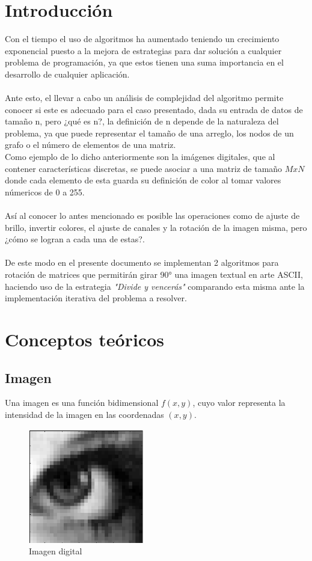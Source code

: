 \documentclass[12pt,twoside]{article}
\begin{document}
    \section{Introducci\'on}
    Con el tiempo el uso de algoritmos ha aumentado teniendo un crecimiento exponencial puesto a la mejora de estrategias para dar soluci\'on a cualquier problema de programaci\'on, ya que estos tienen una suma importancia en el desarrollo de cualquier aplicaci\'on.\\
    \\
    Ante esto, el llevar a cabo un an\'alisis de complejidad del algoritmo permite conocer si este es adecuado para el caso presentado, dada su entrada de datos de tama\~no n, pero ¿qu\'e es n?, la definici\'on de n depende de la naturaleza del problema, ya que puede representar el tama\~no de una arreglo, los nodos de un grafo o el n\'umero de elementos de una matriz.\\
    Como ejemplo de lo dicho anteriormente son la im\'agenes digitales, que al contener caracter\'isticas discretas, se puede asociar a una matriz de tama\~no $MxN$ donde cada elemento de esta guarda su definici\'on de color al tomar valores n\'umericos de 0 a 255.\\
    \\
    As\'i al conocer lo antes mencionado es posible las operaciones como de ajuste de brillo, invertir colores, el ajuste de canales y la rotaci\'on de la imagen misma, pero ¿c\'omo se logran a cada una de estas?.\\
    \\
    De este modo en el presente documento se implementan 2 algoritmos para rotaci\'on de matrices que permitir\'an girar 90° una imagen textual en arte ASCII, haciendo uso de la estrategia {\it "Divide y vencer\'as"} comparando esta misma ante la implementaci\'on iterativa del problema a resolver.

    \section{Conceptos te\'oricos}
        \subsection{Imagen}
        Una imagen es una funci\'on bidimensional $f(x,y)$, cuyo valor representa la intensidad de la imagen en las coordenadas $(x,y)$.
        \begin{figure}[h]
            \centering
            \includegraphics[height=5cm]{imagenes/con1.png}
            \caption{Imagen digital}
        \end{figure}
\end{document}
